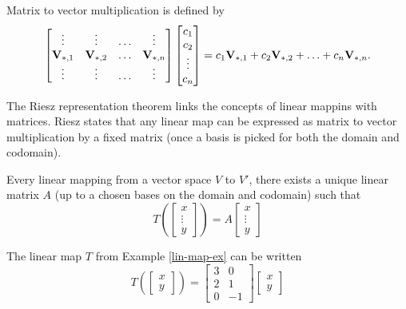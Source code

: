 \begin{definition}
Matrix to vector multiplication is defined by 
$$\begin{bmatrix}
\vdots & \vdots & \ldots & \vdots \\
\MV_{*,1} & \MV_{*,2} & \ldots & \MV_{*,n} \\
\vdots & \vdots & \ldots & \vdots \\
\end{bmatrix} \begin{bmatrix}
c_1 \\
c_2 \\
\vdots \\
c_n
\end{bmatrix} = c_1 \MV_{*,1} + c_2 \MV_{*,2} + \ldots + c_n \MV_{*,n}.$$
\end{definition}

The Riesz representation theorem links the concepts of linear mappins with matrices. Riesz states that any linear map can be expressed as matrix to vector multiplication by a fixed matrix (once a basis is picked for both the domain and codomain).

\begin{theorem} Every linear mapping from a vector space $V$ to $V'$, there exists a unique linear matrix $A$ (up to a chosen bases on the domain and codomain) such that 
$$T\left(\begin{bmatrix}x \\ \vdots \\ y\end{bmatrix}\right) = A \begin{bmatrix}x \\ \vdots \\ y\end{bmatrix}$$
\end{theorem}

\begin{example}
The linear map $T$ from Example \ref{lin-map-ex} can be written 
$$T\left(\begin{bmatrix}x \\y\end{bmatrix}\right) 
= 
\begin{bmatrix}
3 & 0 \\
2 & 1 \\
0 & -1
\end{bmatrix} 
\begin{bmatrix}
x \\
y
\end{bmatrix}$$
\end{example}

